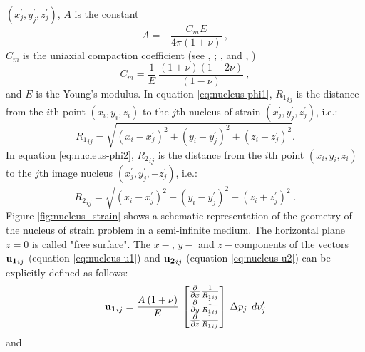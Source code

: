 \documentclass[journal abbreviation, manuscript]{copernicus}
\begin{document}
$(x^{\prime}_{j}, y^{\prime}_{j}, z^{\prime}_{j})$, $A$ is the constant
\begin{equation}
A = - \frac{C_m E}{4 \pi (1 + \nu)} \: ,
\label{eq:nucleus-A}
\end{equation}
$C_m$ is the uniaxial compaction coefficient (see \citeauthor{Geertsma66}, 
\citeyear{Geertsma66}; \citeauthor{Tempone10}, \citeyear{Tempone10} and 
\citeauthor{Munoz&Roehl17}, \citeyear{Munoz&Roehl17}) 
\begin{equation}
C_m = \frac{1}{E} \: \frac{(1 + \nu) (1  - 2\nu)}{(1-\nu)} \: ,
\label{eq:Cm}
\end{equation}
and $E$ is the Young’s modulus.
In equation \ref{eq:nucleus-phi1}, $ {R_1}_{ij}$ is the distance from the $i$th point $ (x_{i}, y_{i}, z_{i})$ to the $j$th nucleus of strain $(x^{\prime}_{j}, y^{\prime}_{j}, z^{\prime}_{j})$, i.e.:
\begin{equation}
{R_1}_{ij} = {\sqrt{(x_{i}- x^{\prime}_{j})^{2} + (y_{i} - y^{\prime}_{j})^{2} + 
(z_{i} - z^{\prime}_{j})^{2}}}.
\label{eq:R1}
\end{equation}
In equation \ref{eq:nucleus-phi2}, $ {R_2}_{ij}$ is the distance from the $i$th point $ (x_{i}, y_{i}, z_{i})$ to the $j$th image nucleus $(x^{\prime}_{j}, y^{\prime}_{j}, - z^{\prime}_{j})$, i.e.:
\begin{equation}
{R_2}_{ij} = {\sqrt{(x_{i}- x^{\prime}_{j})^{2} + (y_{i} - y^{\prime}_{j})^{2} + 
(z_{i} + z^{\prime}_{j})^{2}}} \: .
\label{eq:R2}
\end{equation}
Figure \ref{fig:nucleus_strain} shows a schematic representation of the geometry
of the nucleus of strain problem in a semi-infinite medium. 
The horizontal plane $z = 0$ is called "free surface".
The $x-$, $y-$ and $z-$components of the vectors ${\bf{u_{1}}}_{ij}$ (equation \ref{eq:nucleus-u1}) and ${\bf{u_{2}}}_{ij}$ (equation \ref{eq:nucleus-u2}) 
can be explicitly defined as follows:
\begin{equation}
{\bf{u_{1}}}_{ij} = 
\frac{A  \: (1 + \nu)}{E} \: 
\begin{bmatrix} 
\frac{\partial }{\partial x} {\frac{1}{{R_1}_{ij}}}  \\
\frac{\partial }{\partial y} {\frac{1}{{R_1}_{ij}}}  \\
\frac{\partial }{\partial z} {\frac{1}{{R_1}_{ij}}} 
\end{bmatrix}
 \: \Delta p_{j} \: \:dv_j^{\prime}
\label{eq:nucleus-u1-vector}
\end{equation}
and
\end{document}
